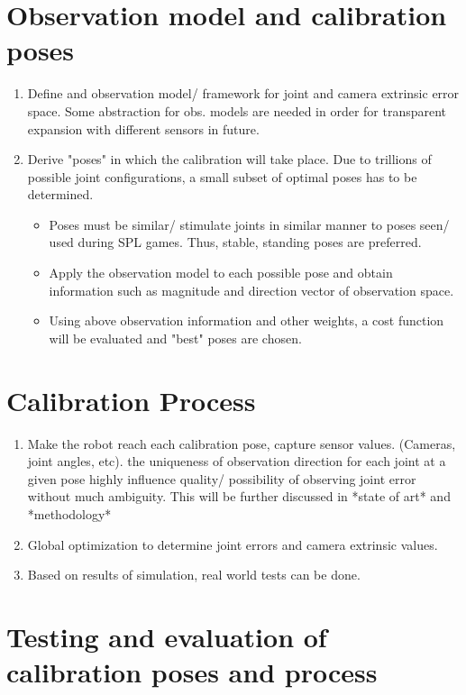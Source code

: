 \documentclass[english, printversion, nomenclature]{tuvisionthesis} %
\begin{document}
\section{Observation model and calibration poses}
\begin{enumerate}
	\item Define and observation model/ framework for joint and camera extrinsic error space.
	\subitem Some abstraction for obs. models are needed in order for transparent expansion with different sensors in future.
	\item Derive "poses" in which the calibration will take place. Due to trillions of possible joint configurations, a small subset of optimal poses has to be determined.
	\begin{itemize}
		\item Poses must be similar/ stimulate joints in similar manner to poses seen/ used during SPL games. Thus, stable, standing poses are preferred.
		\item Apply the observation model to each possible pose and obtain information such as magnitude and direction vector of observation space.
		\item Using above observation information and other weights, a cost function will be evaluated and "best" poses are chosen.
	\end{itemize}
\end{enumerate}
\section{Calibration Process}
\begin{enumerate}
	\item Make the robot reach each calibration pose, capture sensor values. (Cameras, joint angles, etc).
	\subitem the uniqueness of observation direction for each joint at a given pose highly influence quality/ possibility of observing joint error without much ambiguity. This will be further discussed in *state of art* and *methodology*
	\item Global optimization to determine joint errors and camera extrinsic values.
	\item Based on results of simulation, real world tests can be done.
\end{enumerate}

\section{Testing and evaluation of calibration poses and process}
\end{document}
